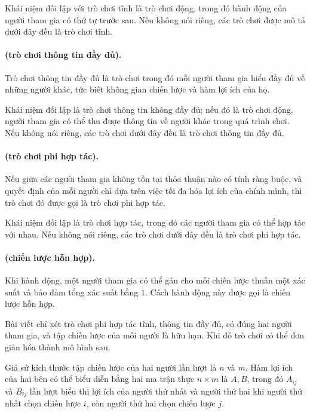 \documentclass[11pt]{article}
\begin{document}
Khái niệm đối lập với trò chơi tĩnh là trò chơi động, trong đó hành động của
người tham gia có thứ tự trước sau. Nếu không nói riêng, các trò chơi được mô
tả dưới đây đều là trò chơi tĩnh.

\paragraph{ (trò chơi thông tin đầy đủ).}
Trò chơi thông tin đầy đủ là trò chơi trong đó mỗi người tham gia hiểu đầy đủ
về những người khác, tức biết không gian chiến lược và hàm lợi ích của họ.

Khái niệm đối lập là trò chơi thông tin không đầy đủ; nếu đó là trò chơi động,
người tham gia có thể thu được thông tin về người khác trong quá trình chơi.
Nếu không nói riêng, các trò chơi dưới đây đều là trò chơi thông tin đầy đủ.

\paragraph{ (trò chơi phi hợp tác).}
Nếu giữa các người tham gia không tồn tại thỏa thuận nào có tính ràng buộc, và
quyết định của mỗi người chỉ dựa trên việc tối đa hóa lợi ích của chính mình,
thì trò chơi đó được gọi là trò chơi phi hợp tác.

Khái niệm đối lập là trò chơi hợp tác, trong đó các người tham gia có thể hợp
tác với nhau. Nếu không nói riêng, các trò chơi dưới đây đều là trò chơi phi
hợp tác.

\paragraph{ (chiến lược hỗn hợp).}
Khi hành động, một người tham gia có thể gán cho mỗi chiến lược thuần một xác
suất và bảo đảm tổng xác suất bằng \(1\). Cách hành động này được gọi là chiến
lược hỗn hợp.

Bài viết chỉ xét trò chơi phi hợp tác tĩnh, thông tin đầy đủ, có đúng hai
người tham gia, và tập chiến lược của mỗi người là hữu hạn. Khi đó trò chơi có
thể đơn giản hóa thành mô hình sau.

Giả sử kích thước tập chiến lược của hai người lần lượt là \(n\) và \(m\). Hàm
lợi ích của hai bên có thể biểu diễn bằng hai ma trận thực \(n\times m\) là
\(A,B\), trong đó \(A_{ij}\) và \(B_{ij}\) lần lượt biểu thị lợi ích của người
thứ nhất và người thứ hai khi người thứ nhất chọn chiến lược \(i\), còn người
thứ hai chọn chiến lược \(j\).
\end{document}
